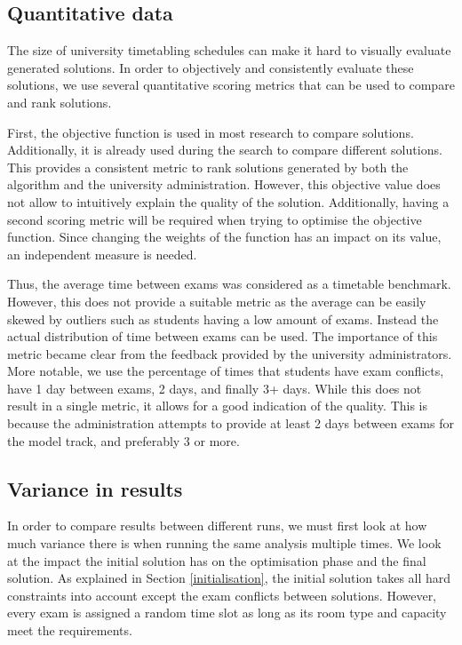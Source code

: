 \subsection{Quantitative data} \label{quantitative}

The size of university timetabling schedules can make it hard to visually evaluate generated solutions. In order to objectively and consistently evaluate these solutions, we use several quantitative scoring metrics that can be used to compare and rank solutions.

First, the objective function is used in most research to compare solutions. Additionally, it is already used during the search to compare different solutions. This provides a consistent metric to rank solutions generated by both the algorithm and the university administration. However, this objective value does not allow to intuitively explain the quality of the solution. Additionally, having a second scoring metric will be required when trying to optimise the objective function. Since changing the weights of the function has an impact on its value, an independent measure is needed.

Thus, the average time between exams was considered as a timetable benchmark. However, this does not provide a suitable metric as the average can be easily skewed by outliers such as students having a low amount of exams. Instead the actual distribution of time between exams can be used. The importance of this metric became clear from the feedback provided by the university administrators. More notable, we use the percentage of times that students have exam conflicts, have 1 day between exams, 2 days, and finally 3+ days. While this does not result in a single metric, it allows for a good indication of the quality. This is because the administration attempts to provide at least 2 days between exams for the model track, and preferably 3 or more.

\subsection{Variance in results} \label{initial}

In order to compare results between different runs, we must first look at how much variance there is when running the same analysis multiple times. We look at the impact the initial solution has on the optimisation phase and the final solution. As explained in Section \ref{initialisation}, the initial solution takes all hard constraints into account except the exam conflicts between solutions. However, every exam is assigned a random time slot as long as its room type and capacity meet the requirements.


